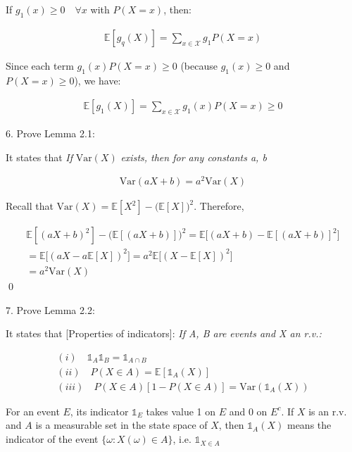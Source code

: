 \documentclass[10pt]{article}
\begin{document}
If $g_1(x) \geq 0 \quad\forall x$ with $P(X = x)$, then: 

\begin{gather*}
    \mathbb{E}[g_q(X)] = \sum_{x \in \mathcal{X}}g_1 P(X = x)
\end{gather*}

Since each term $g_1(x)P(X = x) \geq 0$ (because $g_1(x) \geq 0$ and $P(X = x) \geq 0$), we have:

\begin{gather*}
    \mathbb{E}[g_1(X)] = \sum_{x \in \mathcal{X}} g_1(x) P(X = x) \geq 0
\end{gather*}

\newpage

6. Prove Lemma 2.1:

It states that \textit{If }$\text{Var}(X)$\textit{ exists, then for any constants a, b}

\begin{gather*}
    \text{Var}(aX + b) = a^2\text{Var}(X)
\end{gather*}

Recall that $\text{Var}(X) = \mathbb{E}[X^2] - \big(\mathbb{E}[X]\big)^2$. Therefore, 

\begin{gather*}
    \mathbb{E}[(aX+b)^2] - \big(\mathbb{E}[(aX+b)]\big)^2 = \mathbb{E}\big[(aX+b) - \mathbb{E}[(aX+b)]^2\big] \\
    = \mathbb{E}\big[(aX - a\mathbb{E}[X])^2\big] = a^2\mathbb{E}\big[(X - \mathbb{E}[X])^2\big] \\ 
    = a^2\text{Var}(X)
\end{gather*}
\qed

7. Prove Lemma 2.2: 

It states that [Properties of indicators]: \textit{If A, B are events and X an r.v.:}

\begin{gather*}
    (i)\quad\mathbb{1}_A\mathbb{1}_B = \mathbb{1}_{A\cap B}\\
    (ii)\quad P(X \in A) = \mathbb{E}[\mathbb{1}_A(X)]\\
    (iii)\quad P(X \in A)[1 - P(X \in A)] = \text{Var}(\mathbb{1}_A(X))
\end{gather*}

For an event $E$, its indicator $\mathbb{1}_E$ takes value 1 on $E$ and 0 on $E^c$. If $X$ is an r.v. and $A$ is a measurable set 
in the state space of $X$, then $\mathbb{1}_A(X)$ means the indicator of the event $\{\omega: X(\omega) \in A\}$, i.e. $\mathbb{1}_{X \in A}$
\end{document}
